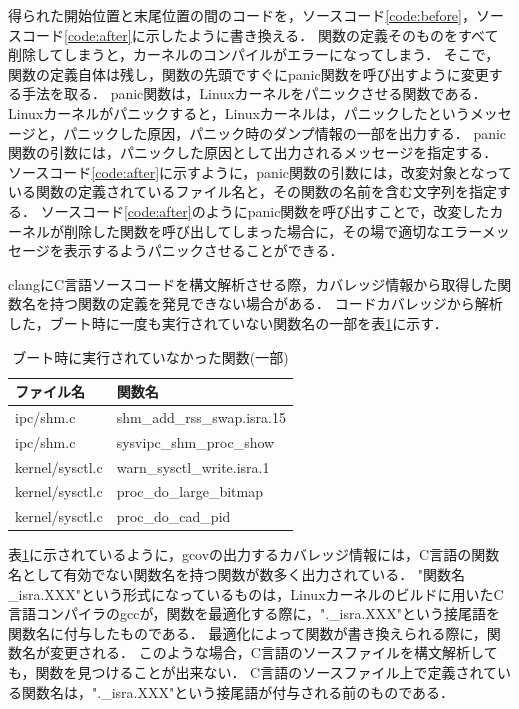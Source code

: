 \documentclass[graduation-thesis]{mlarticle}
\begin{document}
得られた開始位置と末尾位置の間のコードを，ソースコード\ref{code:before}，ソースコード\ref{code:after}に示したように書き換える．
関数の定義そのものをすべて削除してしまうと，カーネルのコンパイルがエラーになってしまう．
そこで，関数の定義自体は残し，関数の先頭ですぐにpanic関数を呼び出すように変更する手法を取る．
panic関数は，Linuxカーネルをパニックさせる関数である．Linuxカーネルがパニックすると，Linuxカーネルは，パニックしたというメッセージと，パニックした原因，パニック時のダンプ情報の一部を出力する．
panic関数の引数には，パニックした原因として出力されるメッセージを指定する．
ソースコード\ref{code:after}に示すように，panic関数の引数には，改変対象となっている関数の定義されているファイル名と，その関数の名前を含む文字列を指定する．
ソースコード\ref{code:after}のようにpanic関数を呼び出すことで，改変したカーネルが削除した関数を呼び出してしまった場合に，その場で適切なエラーメッセージを表示するようパニックさせることができる．

clangにC言語ソースコードを構文解析させる際，カバレッジ情報から取得した関数名を持つ関数の定義を発見できない場合がある．
コードカバレッジから解析した，ブート時に一度も実行されていない関数名の一部を表\ref{table:unusedfunctions}に示す．

\begin{table}[H]
\begin{center}
  \begin{tabular}{ll} \hline
    ファイル名 & 関数名 \\ \hline \hline
    ipc/shm.c & shm\_add\_rss\_swap.isra.15 \\
    ipc/shm.c & sysvipc\_shm\_proc\_show \\
    kernel/sysctl.c & warn\_sysctl\_write.isra.1 \\
    kernel/sysctl.c & proc\_do\_large\_bitmap \\
    kernel/sysctl.c & proc\_do\_cad\_pid \\ \hline
  \end{tabular}
  \caption{ブート時に実行されていなかった関数(一部)}
  \label{table:unusedfunctions}
\end{center}
\end{table}

表\ref{table:unusedfunctions}に示されているように，gcovの出力するカバレッジ情報には，C言語の関数名として有効でない関数名を持つ関数が数多く出力されている．
"関数名\_isra.XXX"という形式になっているものは，Linuxカーネルのビルドに用いたC言語コンパイラのgccが，関数を最適化する際に，".\_isra.XXX"という接尾語を関数名に付与したものである．
最適化によって関数が書き換えられる際に，関数名が変更される．
このような場合，C言語のソースファイルを構文解析しても，関数を見つけることが出来ない．
C言語のソースファイル上で定義されている関数名は，".\_isra.XXX"という接尾語が付与される前のものである．
\end{document}
